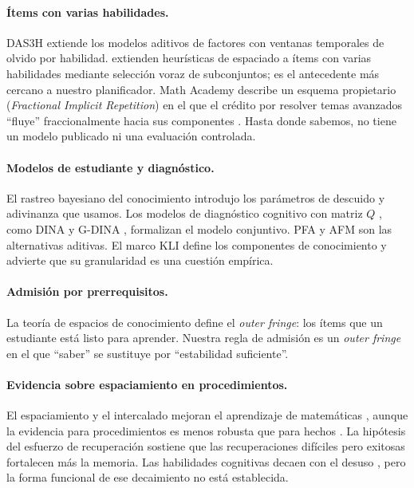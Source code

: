 \documentclass[11pt]{article}
\theoremstyle{definition}
\theoremstyle{remark}
\begin{document}
\paragraph{Ítems con varias habilidades.}
DAS3H \citep{choffin2019} extiende los modelos aditivos de factores con ventanas temporales de olvido por habilidad. \citet{choffin2021} extienden heurísticas de espaciado a ítems con varias habilidades mediante selección voraz de subconjuntos; es el antecedente más cercano a nuestro planificador. Math Academy describe un esquema propietario (\emph{Fractional Implicit Repetition}) en el que el crédito por resolver temas avanzados ``fluye'' fraccionalmente hacia sus componentes \citep{skycak2023}. Hasta donde sabemos, no tiene un modelo publicado ni una evaluación controlada.

\paragraph{Modelos de estudiante y diagnóstico.}
El rastreo bayesiano del conocimiento \citep{corbett1994} introdujo los parámetros de descuido y adivinanza que usamos. Los modelos de diagnóstico cognitivo con matriz $Q$ \citep{tatsuoka1983}, como DINA \citep{junker2001} y G-DINA \citep{delatorre2011}, formalizan el modelo conjuntivo. PFA \citep{pavlik2009} y AFM \citep{cen2006} son las alternativas aditivas. El marco KLI \citep{koedinger2012} define los componentes de conocimiento y advierte que su granularidad es una cuestión empírica.

\paragraph{Admisión por prerrequisitos.}
La teoría de espacios de conocimiento \citep{doignon1985} define el \emph{outer fringe}: los ítems que un estudiante está listo para aprender. Nuestra regla de admisión es un \emph{outer fringe} en el que ``saber'' se sustituye por ``estabilidad suficiente''.

\paragraph{Evidencia sobre espaciamiento en procedimientos.}
El espaciamiento y el intercalado mejoran el aprendizaje de matemáticas \citep{rohrer2007,rohrer2015}, aunque la evidencia para procedimientos es menos robusta que para hechos \citep{barzagar2019}. La hipótesis del esfuerzo de recuperación \citep{pyc2009} sostiene que las recuperaciones difíciles pero exitosas fortalecen más la memoria. Las habilidades cognitivas decaen con el desuso \citep{arthur1998}, pero la forma funcional de ese decaimiento no está establecida.
\end{document}
